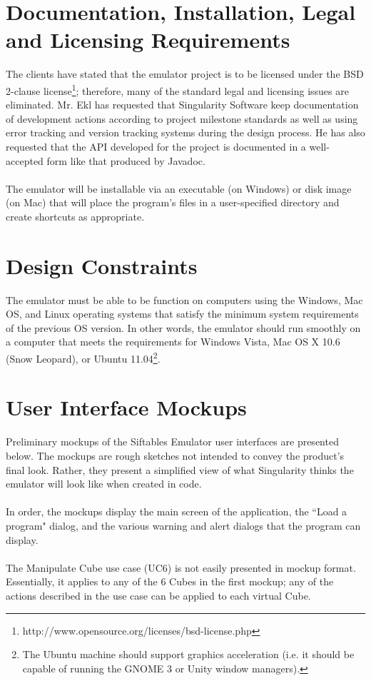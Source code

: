 \documentclass[12pt]{article}
\begin{document}
\section{Documentation, Installation, Legal and Licensing Requirements}
The clients have stated that the emulator project is to be licensed under the BSD 2-clause license\footnote{http://www.opensource.org/licenses/bsd-license.php}; therefore, many of the standard legal and licensing issues are eliminated. Mr. Ekl has requested that Singularity Software keep documentation of development actions according to project milestone standards as well as using error tracking and version tracking systems during the design process. He has also requested that the API developed for the project is documented in a well-accepted form like that produced by Javadoc.\\\\
The emulator will be installable via an executable (on \gls{Windows}) or disk image (on \gls{Mac}) that will place the program's files in a user-specified directory and create shortcuts as appropriate.

\section{Design Constraints}
The emulator must be able to be function on computers using the \gls{Windows}, \gls{Mac} OS, and \gls{Linux} operating systems that satisfy the minimum system requirements of the previous OS version. In other words, the emulator should run smoothly on a computer that meets the requirements for \gls{Windows} Vista, \gls{Mac} OS X 10.6 (Snow Leopard), or Ubuntu 11.04\footnote{The Ubuntu machine should support graphics acceleration (i.e. it should be capable of running the GNOME 3 or Unity window managers).}.

\section{User Interface Mockups}
Preliminary mockups of the Siftables Emulator user interfaces are presented below. The mockups are rough sketches not intended to convey the product's final look. Rather, they present a simplified view of what Singularity thinks the emulator will look like when created in code.\\\\
In order, the mockups display the main screen of the application, the ``Load a program" dialog, and the various warning and alert dialogs that the program can display.\\\\
The Manipulate Cube use case (UC6) is not easily presented in mockup format. Essentially, it applies to any of the 6 Cubes in the first mockup; any of the actions described in the use case can be applied to each virtual Cube.
\end{document}

